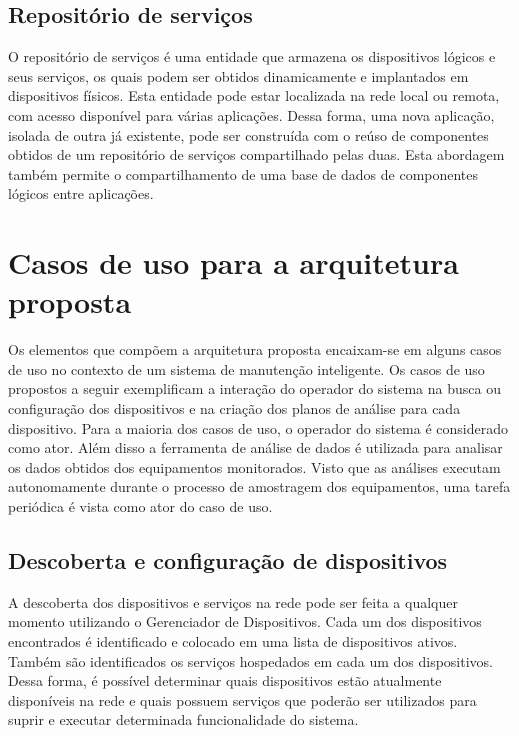 \subsection{Repositório de serviços}

O repositório de serviços é uma entidade que armazena os dispositivos lógicos e seus serviços, os
quais podem ser obtidos dinamicamente e implantados em dispositivos físicos. Esta entidade pode
estar localizada na rede local ou remota, com acesso disponível para várias aplicações. Dessa forma,
uma nova aplicação, isolada de outra já existente, pode ser construída com o reúso de componentes
obtidos de um repositório de serviços compartilhado pelas duas. Esta abordagem também permite o
compartilhamento de uma base de dados de componentes lógicos entre aplicações.


\section{Casos de uso para a arquitetura proposta}

Os elementos que compõem a arquitetura proposta encaixam-se em alguns casos de uso no contexto de um
sistema de manutenção inteligente. Os casos de uso propostos a seguir exemplificam a interação do
operador do sistema na busca ou configuração dos dispositivos e na criação dos planos de análise
para cada dispositivo. Para a maioria dos casos de uso, o operador do sistema é considerado como
ator. Além disso a ferramenta de análise de dados é utilizada para analisar os dados obtidos dos
equipamentos monitorados. Visto que as análises executam autonomamente durante o processo de
amostragem dos equipamentos, uma tarefa periódica é vista como ator do caso de uso.


\subsection{Descoberta e configuração de dispositivos}
\label{sub:proposta-descoberta-configuracao-dispositivos}

A descoberta dos dispositivos e serviços na rede pode ser feita a qualquer momento utilizando o
Gerenciador de Dispositivos. Cada um dos dispositivos encontrados é identificado e colocado em uma
lista de dispositivos ativos. Também são identificados os serviços hospedados em cada um dos
dispositivos. Dessa forma, é possível determinar quais dispositivos estão atualmente disponíveis na
rede e quais possuem serviços que poderão ser utilizados para suprir e executar determinada
funcionalidade do sistema.

